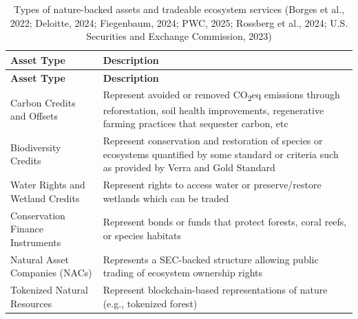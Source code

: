 \documentclass[
  12pt,
  letterpaper,
  DIV=11,
  numbers=noendperiod]{scrartcl}
\begin{document}
\def\pandoctableshortcapt{Types of Nature-Backed Assets and Tradeable
Ecosystem Services}

\begin{longtable}[]{@{}
  >{\raggedright\arraybackslash}p{}
  >{\raggedright\arraybackslash}p{}@{}}
\caption[Types of Nature-Backed Assets and Tradeable Ecosystem
Services]{Types of nature-backed assets and tradeable ecosystem services
(Borges et al., 2022; Deloitte, 2024; Fiegenbaum, 2024; PWC, 2025;
Rossberg et al., 2024; U.S. Securities and Exchange Commission,
2023)}\tabularnewline
\toprule\noalign{}
\begin{minipage}[b]{\linewidth}\raggedright
\textbf{Asset Type}
\end{minipage} & \begin{minipage}[b]{\linewidth}\raggedright
\textbf{Description}
\end{minipage} \\
\midrule\noalign{}
\endfirsthead
\toprule\noalign{}
\begin{minipage}[b]{\linewidth}\raggedright
\textbf{Asset Type}
\end{minipage} & \begin{minipage}[b]{\linewidth}\raggedright
\textbf{Description}
\end{minipage} \\
\midrule\noalign{}
\endhead
\bottomrule\noalign{}
\endlastfoot
Carbon Credits and Offsets & Represent avoided or removed
CO\textsubscript{2}eq emissions through reforestation, soil health
improvements, regenerative farming practices that sequester carbon,
etc \\
Biodiversity Credits & Represent conservation and restoration of species
or ecosystems quantified by some standard or criteria such as provided
by Verra and Gold Standard \\
Water Rights and Wetland Credits & Represent rights to access water or
preserve/restore wetlands which can be traded \\
Conservation Finance Instruments & Represent bonds or funds that protect
forests, coral reefs, or species habitats \\
Natural Asset Companies (NACs) & Represents a SEC-backed structure
allowing public trading of ecosystem ownership rights \\
Tokenized Natural Resources & Represent blockchain-based representations
of nature (e.g., tokenized forest) \\
\end{longtable}
\end{document}
